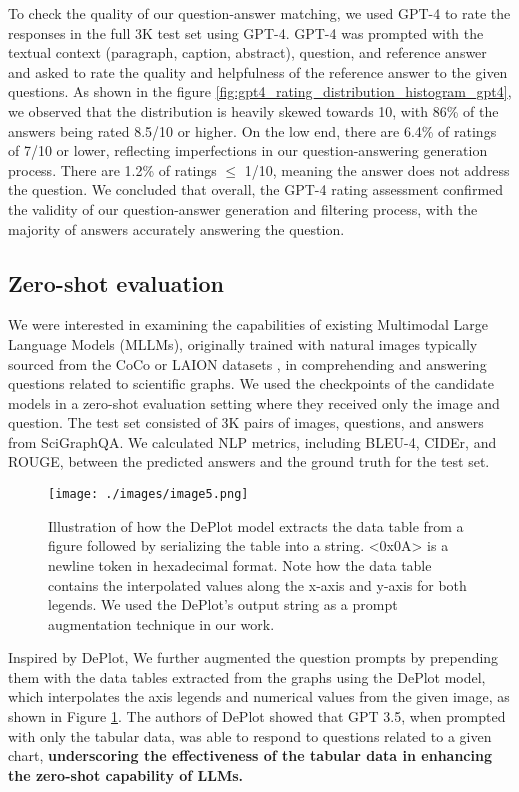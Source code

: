 \documentclass{article}
\begin{document}
To check the quality of our question-answer matching, we used GPT-4 to rate the responses in the full 3K test set using GPT-4. GPT-4 was prompted with the textual context (paragraph, caption, abstract), question, and reference answer and asked to rate the quality and helpfulness of the reference answer to the given questions. As shown in the figure \ref{fig:gpt4_rating_distribution_histogram_gpt4}, we observed that the distribution is heavily skewed towards 10, with 86\% of the answers being rated 8.5/10 or higher. On the low end, there are 6.4\% of ratings of 7/10 or lower, reflecting imperfections in our question-answering generation process. There are 1.2\% of ratings $\leq$ 1/10, meaning the answer does not address the question. We concluded that overall, the GPT-4 rating assessment confirmed the validity of our question-answer generation and filtering process, with the majority of answers accurately answering the question.


\subsection{Zero-shot evaluation}
\label{zero-shot-method}
We were interested in examining the capabilities of existing Multimodal Large Language Models (MLLMs), originally trained with natural images typically sourced from the CoCo or LAION datasets \cite{yin2023survey}, in comprehending and answering questions related to scientific graphs. We used the checkpoints of the candidate models in a zero-shot evaluation setting where they received only the image and question. The test set consisted of 3K pairs of images, questions, and answers from SciGraphQA. We calculated NLP metrics, including BLEU-4, CIDEr, and ROUGE, between the predicted answers and the ground truth for the test set. 

\begin{figure}[!htbp]\label{fig:deplot}
\centering
\texttt{[image: ./images/image5.png]}
\caption{Illustration of how the DePlot model extracts the data table from a figure followed by serializing the table into a string.  \textless{}0x0A\textgreater{} is a newline token in hexadecimal format. Note how the data table contains the interpolated values along the x-axis and y-axis for both legends. We used the DePlot's output string as a prompt augmentation technique in our work.}
\end{figure}

Inspired by DePlot\cite{liu2022deplot}, We further augmented the question prompts by prepending them with the data tables extracted from the graphs using the DePlot model, which interpolates the axis legends and numerical values from the given image, as shown in Figure \ref{fig:deplot}. The authors of DePlot showed that GPT 3.5, when prompted with only the tabular data, was able to respond to questions related to a given chart, {\bf underscoring the effectiveness of the tabular data in enhancing the zero-shot capability of LLMs.}
\end{document}
